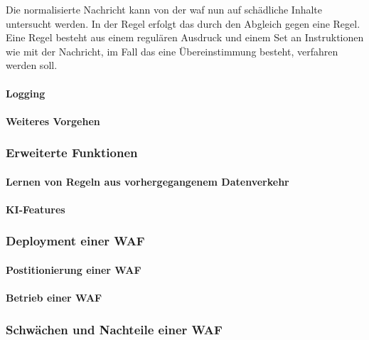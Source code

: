 Die normalisierte Nachricht kann von der \ac{waf} nun auf schädliche Inhalte untersucht werden.
In der Regel erfolgt das durch den Abgleich gegen eine Regel.
Eine Regel besteht aus einem regulären Ausdruck und einem Set an Instruktionen wie mit der Nachricht, im Fall das eine Übereinstimmung besteht, verfahren werden soll. 



\paragraph{Logging}

\paragraph{Weiteres Vorgehen}
% 

\subsubsection{Erweiterte Funktionen}
\paragraph{Lernen von Regeln aus vorhergegangenem Datenverkehr}
\paragraph{KI-Features}
\subsubsection{Deployment einer WAF}
\paragraph{Postitionierung einer WAF}
\paragraph{Betrieb einer WAF}
\subsubsection{Schwächen und Nachteile einer WAF}
